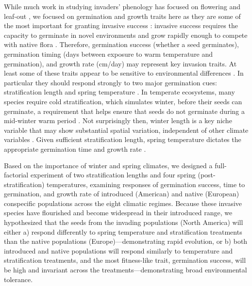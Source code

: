 \documentclass[11pt]{article}\usepackage[]{graphicx}\usepackage[]{color}
\begin{document}
While much work in studying invaders' phenology has focused on flowering and leaf-out \parencite[e.g.,][]{Zohner2017}, we focused on germination and growth traits here as they are some of the most important for granting invasive success \parencite{Sattin1997, Maillet2000}: invasive success requires the capacity to germinate in novel environments and grow rapidly enough to compete with native flora \parencites[see][and papers reviewed therein]{ Gioria2017}{Grime1988,Chrobock2011}. Therefore, germination success (whether a seed germinates), germination timing (days between exposure to warm temperature and germination), and growth rate (cm/day) may represent key invasion traits. At least some of these traits appear to be sensitive to environmental differences \parencite{Leger2007,Paudel2013,}. In particular they should respond strongly to two major germination cues: stratification length and spring temperature \parencite{Finch2006}. In temperate ecosystems, many species require cold stratification, which simulates winter, before their seeds can germinate, a requirement that helps ensure that seeds do not germinate during a mid-winter warm period \parencite{Baskin1998,Popay1970,Wulff1994}. Not surprisingly then, winter length is a key niche variable \parencite{Harte2015} that may show substantial spatial variation, independent of other climate variables \parencite{Bonan2003}. Given sufficient stratification length, spring temperature dictates the appropriate germination time and growth rate \parencite{Egli1980,Guilioni2003}. 

Based on the importance of winter and spring climates, we designed a full-factorial experiment of two stratification lengths and four spring (post-stratification) temperatures, examining responses of germination success, time to germination, and growth rate of introduced (American) and native (European) conspecific populations across the eight climatic regimes. Because these invasive species have flourished and become widespread in their introduced range, we hypothesized that the seeds from the invading populations (North America) will either a) respond differently to spring temperature and stratification treatments than the native populations (Europe)---demonstrating rapid evolution, or b) both introduced and native populations will respond similarly to temperature and stratification treatments, and the most fitness-like trait, germination success, will be high and invariant across the treatments---demonstrating broad environmental tolerance. %
\end{document}
